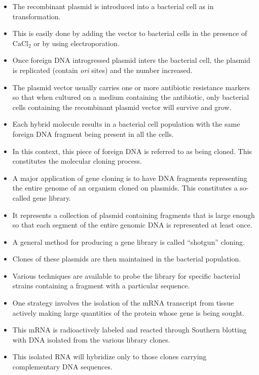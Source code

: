 \documentclass[11pt,dvipsnames,ignorenonframetext,aspectratio=169]{beamer}
\providecommand{\tightlist}{%
  \setlength{\itemsep}{0pt}\setlength{\parskip}{0pt}}
\begin{document}
\begin{frame}{}
\protect\hypertarget{section-19}{}
\begin{itemize}
\tightlist
\item
  The recombinant plasmid is introduced into a bacterial cell as in
  transformation.
\item
  This is easily done by adding the vector to bacterial cells in the
  presence of \(\mathrm{CaCl_2}\) or by using electroporation.
\item
  Once foreign DNA introgressed plasmid inters the bacterial cell, the
  plasmid is replicated (contain \emph{ori} sites) and the number
  increased.
\item
  The plasmid vector usually carries one or more antibiotic resistance
  markers so that when cultured on a medium containing the antibiotic,
  only bacterial cells containing the recombinant plasmid vector will
  survive and grow.
\item
  Each hybrid molecule results in a bacterial cell population with the
  same foreign DNA fragment being present in all the cells.
\item
  In this context, this piece of foreign DNA is referred to as being
  cloned. This constitutes the molecular cloning process.
\end{itemize}
\end{frame}

\begin{frame}{}
\protect\hypertarget{section-20}{}
\begin{itemize}
\tightlist
\item
  A major application of gene cloning is to have DNA fragments
  representing the entire genome of an organism cloned on plasmids. This
  constitutes a so-called gene library.
\item
  It represents a collection of plasmid containing fragments that is
  large enough so that each segment of the entire genomic DNA is
  represented at least once.
\item
  A general method for producing a gene library is called ``shotgun''
  cloning.
\item
  Clones of these plasmids are then maintained in the bacterial
  population.
\item
  Various techniques are available to probe the library for specific
  bacterial strains containing a fragment with a particular sequence.
\item
  One strategy involves the isolation of the mRNA transcript from tissue
  actively making large quantities of the protein whose gene is being
  sought.
\item
  This mRNA is radioactively labeled and reacted through Southern
  blotting with DNA isolated from the various library clones.
\item
  This isolated RNA will hybridize only to those clones carrying
  complementary DNA sequences.
\end{itemize}
\end{frame}
\end{document}
